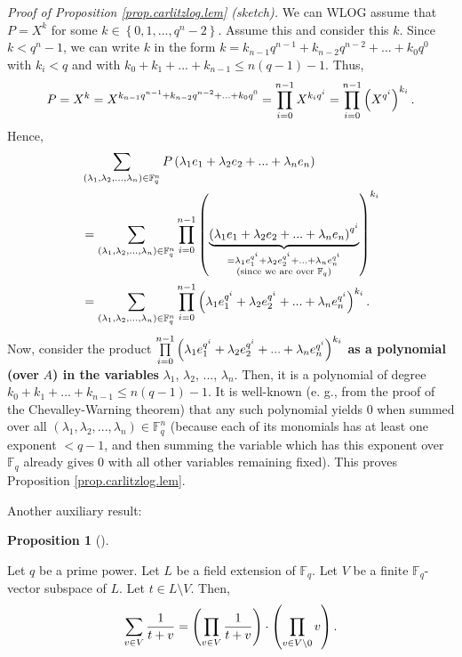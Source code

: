 \documentclass[numbers=enddot,12pt,final,onecolumn,notitlepage]{scrartcl}%
\theoremstyle{definition}
\newtheorem{prop}[theo]{Proposition}
\newenvironment{proposition}[1][]
{\begin{prop}[#1]\begin{leftbar}}
{\end{leftbar}\end{prop}}
\let\sumnonlimits\sum
\let\prodnonlimits\prod
\renewcommand{\sum}{\sumnonlimits\limits}
\renewcommand{\prod}{\prodnonlimits\limits}
\begin{document}
\textit{Proof of Proposition \ref{prop.carlitzlog.lem} (sketch).} We can WLOG
assume that $P=X^{k}$ for some $k\in\left\{  0,1,...,q^{n}-2\right\}  $.
Assume this and consider this $k$. Since $k<q^{n}-1$, we can write $k$ in the
form $k=k_{n-1}q^{n-1}+k_{n-2}q^{n-2}+...+k_{0}q^{0}$ with $k_{i}<q$ and with
$k_{0}+k_{1}+...+k_{n-1}\leq n\left(  q-1\right)  -1$. Thus,%
\[
P=X^{k}=X^{k_{n-1}q^{n-1}+k_{n-2}q^{n-2}+...+k_{0}q^{0}}=\prod\limits_{i=0}%
^{n-1}X^{k_{i}q^{i}}=\prod\limits_{i=0}^{n-1}\left(  X^{q^{i}}\right)
^{k_{i}}.
\]
Hence,%
\begin{align*}
&  \sum\limits_{\left(  \lambda_{1},\lambda_{2},...,\lambda_{n}\right)
\in\mathbb{F}_{q}^{n}}P\left(  \lambda_{1}e_{1}+\lambda_{2}e_{2}%
+...+\lambda_{n}e_{n}\right) \\
&  =\sum\limits_{\left(  \lambda_{1},\lambda_{2},...,\lambda_{n}\right)
\in\mathbb{F}_{q}^{n}}\prod\limits_{i=0}^{n-1}\left(  \underbrace{\left(
\lambda_{1}e_{1}+\lambda_{2}e_{2}+...+\lambda_{n}e_{n}\right)  ^{q^{i}}%
}_{\substack{=\lambda_{1}e_{1}^{q^{i}}+\lambda_{2}e_{2}^{q^{i}}+...+\lambda
_{n}e_{n}^{q^{i}}\\\text{(since we are over }\mathbb{F}_{q}\text{)}}}\right)
^{k_{i}}\\
&  =\sum\limits_{\left(  \lambda_{1},\lambda_{2},...,\lambda_{n}\right)
\in\mathbb{F}_{q}^{n}}\prod\limits_{i=0}^{n-1}\left(  \lambda_{1}e_{1}^{q^{i}%
}+\lambda_{2}e_{2}^{q^{i}}+...+\lambda_{n}e_{n}^{q^{i}}\right)  ^{k_{i}}.
\end{align*}
Now, consider the product $\prod\limits_{i=0}^{n-1}\left(  \lambda_{1}%
e_{1}^{q^{i}}+\lambda_{2}e_{2}^{q^{i}}+...+\lambda_{n}e_{n}^{q^{i}}\right)
^{k_{i}}$ \textbf{as a polynomial (over }$A$\textbf{) in the variables
}$\lambda_{1}$, $\lambda_{2}$, $...$, $\lambda_{n}$. Then, it is a polynomial
of degree $k_{0}+k_{1}+...+k_{n-1}\leq n\left(  q-1\right)  -1$. It is
well-known (e. g., from the proof of the Chevalley-Warning theorem) that any
such polynomial yields $0$ when summed over all $\left(  \lambda_{1}%
,\lambda_{2},...,\lambda_{n}\right)  \in\mathbb{F}_{q}^{n}$ (because each of
its monomials has at least one exponent $<q-1$, and then summing the variable
which has this exponent over $\mathbb{F}_{q}$ already gives $0$ with all other
variables remaining fixed). This proves Proposition \ref{prop.carlitzlog.lem}.

Another auxiliary result:

\begin{proposition}
\label{prop.carlitzlog.lem2}Let $q$ be a prime power. Let $L$ be a field
extension of $\mathbb{F}_{q}$. Let $V$ be a finite $\mathbb{F}_{q}$-vector
subspace of $L$. Let $t\in L\setminus V$. Then,%
\[
\sum\limits_{v\in V}\dfrac{1}{t+v}=\left(  \prod\limits_{v\in V}\dfrac{1}%
{t+v}\right)  \cdot\left(  \prod\limits_{v\in V\setminus0}v\right)  .
\]

\end{proposition}
\end{document}
